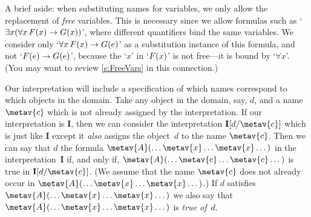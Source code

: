 
A brief aside: when substituting names for variables, we only allow
the replacement of \emph{free} variables. This is necessary since we
allow formulas such as `$\exists x(\forall x\,\mathord{F}(x) \rightarrow
\mathord{G}(x))$', where different quantifiers bind the same variables.
We consider only `$\forall x\,\mathord{F}(x) \rightarrow \mathord{G}(e)$' as a
substitution instance of this formula, and not `$\mathord{F}(e) \rightarrow
\mathord{G}(e)$', because the `$x$' in `$\mathord{F}(x)$' is not free---it
is bound by `$\forall x$'. (You may want to review \cref{s:FreeVars}
in this connection.)

Our interpretation will include a specification of which names
correspond to which objects in the domain. Take any object in the
domain, say, $d$, and a name $\metav{c}$ which is not already assigned
by the interpretation. If our interpretation is $\mathbf{I}$, then we
can consider the interpretation $\mathbf{I}[d/\metav{c}]$ which is
just like $\mathbf{I}$ except it \emph{also} assigns the object~$d$ to
the name $\metav{c}$. Then we can say that $d$  the
formula $\metav{A}(\dots\metav{x}\dots\metav{x}\dots)$ in the
interpretation~$\mathbf{I}$ if, and only if,
$\metav{A}(\dots\metav{c}\dots\metav{c}\dots)$ is true in
$\mathbf{I}[d/\metav{c}]$. (We assume that the name $\metav{c}$ does
not already occur in $\metav{A}(\dots\metav{x}\dots\metav{x}\dots)$.)
If $d$ satisfies $\metav{A}(\dots\metav{x}\dots\metav{x}\dots)$ we
also say that $\metav{A}(\dots\metav{x}\dots\metav{x}\dots)$ is
\emph{true of}~$d$.


